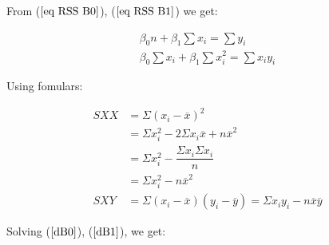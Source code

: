 \documentclass{article}
\begin{document}
    From ($\ref{eq RSS B0}$), ($\ref{eq RSS B1}$) we get: 
    
    \begin{align} 
        \label {dB0}
        \beta_{0} n + \beta_{1} \displaystyle \sum x_{i} = \displaystyle \sum y_{i}
        \\
        \label {dB1}
        \beta_{0} \displaystyle \sum x_{i} + \beta_{1} \displaystyle \sum x_{i}^2 = \displaystyle \sum x_{i} y_{i}
    \end{align}
    
    Using fomulars: 
    
     \begin{align} 
        SXX &= \Sigma (x_{i} - \overline{x})^2 \\
        &= \Sigma x_{i}^2 - 2 \Sigma x_{i} \overline{x} + n\overline{x}^2  \nonumber \\
        &= \Sigma x_{i}^2 - \dfrac{\Sigma x_{i} \Sigma x_{i}}{n} \nonumber \\
        &= \Sigma x_{i}^2 - n\overline{x}^2 \nonumber \\
        SXY &= \Sigma (x_{i} - \overline{x})(y_{i} - \overline{y}) = \Sigma x_{i}y_{i} - n\overline{x}\overline{y}
    \end{align}
    
    Solving ($\ref{dB0}$), ($\ref{dB1}$), we get:
    
\end{document}
